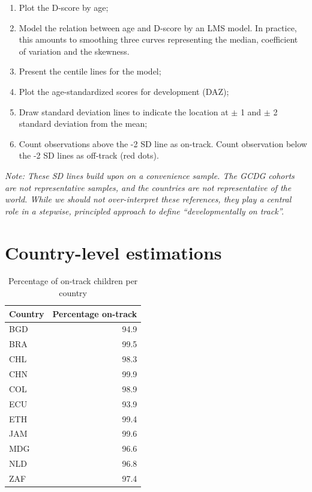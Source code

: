 \documentclass[
]{book}
\providecommand{\tightlist}{%
  \setlength{\itemsep}{0pt}\setlength{\parskip}{0pt}}
\begin{document}
\begin{enumerate}
\def\labelenumi{\arabic{enumi}.}
\tightlist
\item
  Plot the D-score by age;
\item
  Model the relation between age and D-score by an LMS model. In practice, this amounts to smoothing three curves representing the median, coefficient of variation and the skewness.
\item
  Present the centile lines for the model;
\item
  Plot the age-standardized scores for development (DAZ);
\item
  Draw standard deviation lines to indicate the location at \(\pm\) 1 and \(\pm\) 2 standard deviation from the mean;
\item
  Count observations above the -2 SD line as on-track. Count observation below the -2 SD lines as off-track (red dots).
\end{enumerate}

\emph{Note: These SD lines build upon on a convenience sample. The GCDG cohorts are not representative samples, and the countries are not representative of the world. While we should not over-interpret these references, they play a central role in a stepwise, principled approach to define ``developmentally on track''.}

\hypertarget{sec:countrytrack}{%
\section{Country-level estimations}\label{sec:countrytrack}}

\begin{table}

\caption{\label{tab:ontrack}Percentage of on-track children per country}
\centering
\begin{tabular}[t]{l|r}
\hline
Country & Percentage on-track\\
\hline
BGD & 94.9\\
\hline
BRA & 99.5\\
\hline
CHL & 98.3\\
\hline
CHN & 99.9\\
\hline
COL & 98.9\\
\hline
ECU & 93.9\\
\hline
ETH & 99.4\\
\hline
JAM & 99.6\\
\hline
MDG & 96.6\\
\hline
NLD & 96.8\\
\hline
ZAF & 97.4\\
\hline
\end{tabular}
\end{table}
\end{document}
